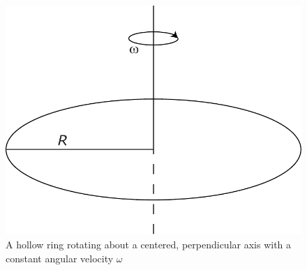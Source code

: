 \begin{figure}[H]
  \centering
  \includegraphics[width=0.25\linewidth]{fig/images/rotating_ring.pdf}
  \caption{A hollow ring rotating about a centered, perpendicular axis with a constant angular velocity $\omega$}
  \label{fig:rotating_ring}
\end{figure}